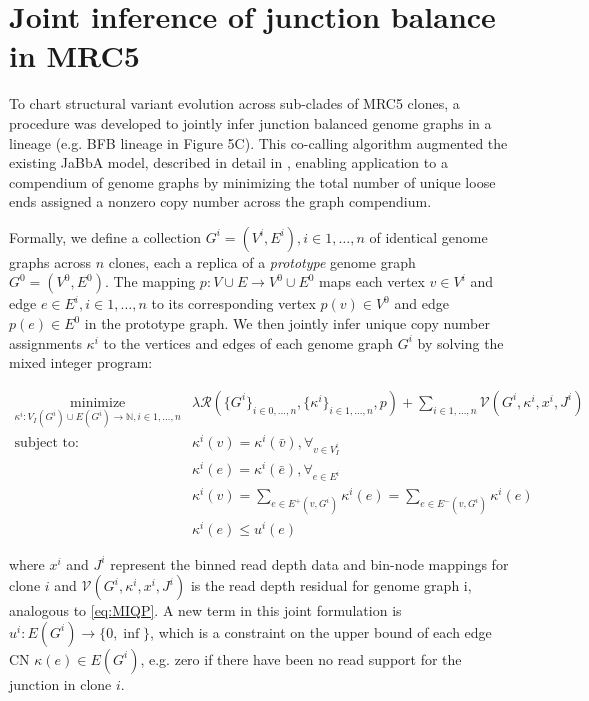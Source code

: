 \documentclass[phd,tocprelim]{cornell}
\begin{document}
\section{Joint inference of junction balance in MRC5} \label{sec:joint_jabba_mrc5}
To chart structural variant evolution across sub-clades of MRC5 clones, a procedure was developed to jointly infer junction balanced genome graphs in a lineage (e.g. BFB lineage in Figure 5C). This co-calling algorithm augmented the existing JaBbA model, described in detail in \cite{Hadi2020-um}, enabling application to a compendium of genome graphs by minimizing the total number of unique loose ends assigned a nonzero copy number across the graph compendium.  

Formally, we define a collection ${G^i = (V^i, E^i)}, i \in 1,\dots,n$ of identical genome graphs across $n$ clones, each a replica of a \textit{prototype} genome graph $G^0 = (V^0, E^0)$. The mapping $p:V \cup E \rightarrow V^0 \cup E^0$ maps each vertex $v \in V^i$ and edge $e \in E^i,i \in 1,\dots,n$ to its corresponding vertex $p(v)\in V^0$ and edge $p(e) \in E^0$ in the prototype graph. We then jointly infer unique copy number assignments $\kappa^i$ to the vertices and edges of each genome graph $G^i$ by solving the mixed integer program:

\begin{equation} \label{eq:multi_sample_jabba}
    \begin{aligned}
        \underset{\kappa^i:V_I(G^i) \cup E(G^i) \rightarrow \mathbb{N}, i \in 1,\dots,n}{\text{minimize}} &
        \lambda \mathcal{R}(\{G^i\}_{i \in 0, \dots, n}, \{\kappa^i\}_{i \in 1, \dots, n}, p) + \sum_{i \in 1,\dots,n}\mathcal{V}(G^i, \kappa^i, x^i, J^i) \\
        \text{subject to: } & \kappa^i(v) = \kappa^i(\bar{v}), \forall_{v \in V_I^i} \\
        & \kappa^i(e) = \kappa^i(\bar{e}), \forall_{e \in E^i} \\
        & \kappa^i(v) = \sum_{e \in E^+(v,G^i)}\kappa^i(e) = \sum_{e \in E^-(v, G^i)}\kappa^i(e) \\
        & \kappa^i(e) \le u^i(e)
    \end{aligned}
\end{equation}

where $x^i$ and $J^i$ represent the binned read depth data and bin-node mappings for clone $i$ and  $\mathcal{V}(G^i,κ^i,x^i,J^i)$ is the read depth residual for genome graph i, analogous to \ref{eq:MIQP}.  A new term in this joint formulation is $u^i:E(G^i) \rightarrow \{0,\inf\}$, which is a constraint on the upper bound of each edge CN $\kappa(e) \in E(G^i)$, e.g. zero if there have been no read support for the junction in clone $i$. 
\end{document}
